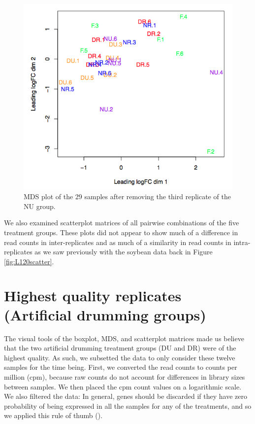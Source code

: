 \documentclass[11pt,a4paper,oldfontcommands,openany]{memoir}
\numberwithin{equation}{section} %
\begin{document}
\begin{figure}[H]
    \begin{framed}
    \centering
    \includegraphics[width=\textwidth]{mdsPW}
    \end{framed}
    \caption{MDS plot of the 29 samples after removing the third replicate of the NU group.}
    \label{fig:mdsPW}
\end{figure}

We also examined scatterplot matrices of all pairwise combinations of the five treatment groups. These plots did not appear to show much of a difference in read counts in inter-replicates and as much of a similarity in read counts in intra-replicates as we saw previously with the soybean data back in Figure \ref{fig:L120scatter}.

\section{Highest quality replicates (Artificial drumming groups)}

The visual tools of the boxplot, MDS, and scatterplot matrices made us believe that the two artificial drumming treatment groups (DU and DR) were of the highest quality. As such, we subsetted the data to only consider these twelve samples for the time being. First, we converted the read counts to counts per million (cpm), because raw counts  do not account for differences in library sizes between samples. We then placed the cpm count values on a logarithmic scale. We also filtered the data: In general, genes should be discarded if they have zero probability of being expressed in all the samples for any of the treatments, and so we applied this rule of thumb (\citealt{edger}).
\end{document}
